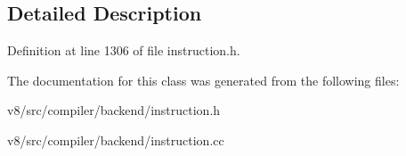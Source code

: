 \subsection{Detailed Description}


Definition at line 1306 of file instruction.\+h.



The documentation for this class was generated from the following files\+:\begin{DoxyCompactItemize}
\item 
v8/src/compiler/backend/instruction.\+h\item 
v8/src/compiler/backend/instruction.\+cc\end{DoxyCompactItemize}
